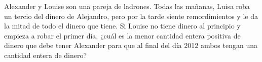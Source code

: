 Alexander y Louise son una pareja de ladrones. Todas las mañanas, Luisa roba un tercio del dinero de Alejandro, pero por la tarde siente remordimientos y le da la mitad de todo el dinero que tiene. Si Louise no tiene dinero al principio y empieza a robar el primer día, ¿cuál es la menor cantidad entera positiva de dinero que debe tener Alexander para que al final del día 2012 ambos tengan una cantidad entera de dinero?

